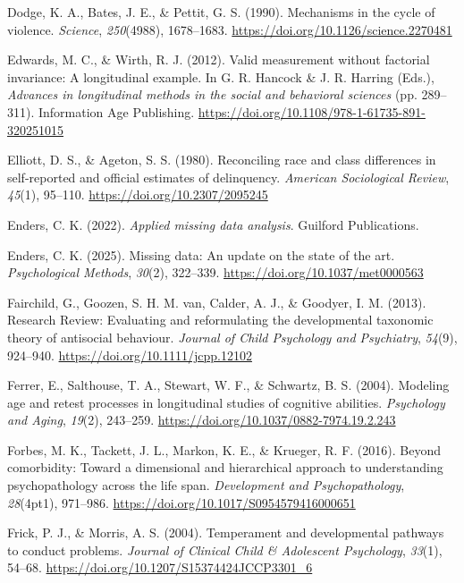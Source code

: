 \documentclass[
  american,
  letterpaper,
  12pt]{article}
\newlength{\cslhangindent}
\newenvironment{CSLReferences}[2] %
 {\begin{list}{}{%
  \setlength{\itemindent}{0pt}
  \setlength{\leftmargin}{0pt}
  \setlength{\parsep}{0pt}
  \ifodd #1
   \setlength{\leftmargin}{\cslhangindent}
   \setlength{\itemindent}{-1\cslhangindent}
  \fi
  \setlength{\itemsep}{#2\baselineskip}}}
 {\end{list}}
\begin{document}
\begin{CSLReferences}{1}{0}
Dodge, K. A., Bates, J. E., \& Pettit, G. S. (1990). Mechanisms in the
cycle of violence. \emph{Science}, \emph{250}(4988), 1678--1683.
\url{https://doi.org/10.1126/science.2270481}

Edwards, M. C., \& Wirth, R. J. (2012). Valid measurement without
factorial invariance: {A} longitudinal example. In G. R. Hancock \& J.
R. Harring (Eds.), \emph{Advances in longitudinal methods in the social
and behavioral sciences} (pp. 289--311). Information Age Publishing.
\url{https://doi.org/10.1108/978-1-61735-891-320251015}

Elliott, D. S., \& Ageton, S. S. (1980). Reconciling race and class
differences in self-reported and official estimates of delinquency.
\emph{American Sociological Review}, \emph{45}(1), 95--110.
\url{https://doi.org/10.2307/2095245}

Enders, C. K. (2022). \emph{Applied missing data analysis}. Guilford
Publications.

Enders, C. K. (2025). Missing data: {An} update on the state of the art.
\emph{Psychological Methods}, \emph{30}(2), 322--339.
\url{https://doi.org/10.1037/met0000563}

Fairchild, G., Goozen, S. H. M. van, Calder, A. J., \& Goodyer, I. M.
(2013). {Research Review}: {Evaluating and reformulating the
developmental taxonomic theory of antisocial behaviour}. \emph{Journal
of Child Psychology and Psychiatry}, \emph{54}(9), 924--940.
\url{https://doi.org/10.1111/jcpp.12102}

Ferrer, E., Salthouse, T. A., Stewart, W. F., \& Schwartz, B. S. (2004).
Modeling age and retest processes in longitudinal studies of cognitive
abilities. \emph{Psychology and Aging}, \emph{19}(2), 243--259.
\url{https://doi.org/10.1037/0882-7974.19.2.243}

Forbes, M. K., Tackett, J. L., Markon, K. E., \& Krueger, R. F. (2016).
Beyond comorbidity: {Toward} a dimensional and hierarchical approach to
understanding psychopathology across the life span. \emph{Development
and Psychopathology}, \emph{28}(4pt1), 971--986.
\url{https://doi.org/10.1017/S0954579416000651}

Frick, P. J., \& Morris, A. S. (2004). Temperament and developmental
pathways to conduct problems. \emph{Journal of Clinical Child \&
Adolescent Psychology}, \emph{33}(1), 54--68.
\url{https://doi.org/10.1207/S15374424JCCP3301_6}


\end{CSLReferences}
\end{document}
